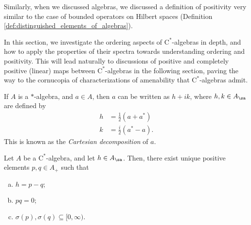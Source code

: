 Similarly, when we discussed algebras, we discussed a definition of positivity very similar to the case of bounded operators on Hilbert spaces (Definition \ref{def:distinguished_elements_of_algebras}).\newline

In this section, we investigate the ordering aspects of $\mathrm{C}^{\ast}$-algebras in depth, and how to apply the properties of their spectra towards understanding ordering and positivity. This will lead naturally to discussions of positive and completely positive (linear) maps between $\mathrm{C}^{\ast}$-algebras in the following section, paving the way to the cornucopia of characterizations of amenability that $\mathrm{C}^{\ast}$-algebras admit.
\begin{definition}
  If $A$ is a $\ast$-algebra, and $a\in A$, then $a$ can be written as $h + ik$, where $h,k\in A_{\sa}$ are defined by
  \begin{align*}
    h &= \frac{1}{2}\left( a + a^{\ast} \right)\\
    k &= \frac{i}{2}\left( a^{\ast}-a \right).
  \end{align*}
  This is known as the \textit{Cartesian decomposition} of $a$.
\end{definition}
\begin{proposition}\label{prop:self_adjoint_positive_decomposition}
  Let $A$ be a $\mathrm{C}^{\ast}$-algebra, and let $h\in A_{\sa}$. Then, there exist unique positive elements $p,q\in A_{+}$ such that
  \begin{enumerate}[(a)]
    \item $h = p-q$;
    \item $pq = 0$;
    \item $\sigma\left( p \right),\sigma\left( q \right)\subseteq [0,\infty)$.
  \end{enumerate}
\end{proposition}
